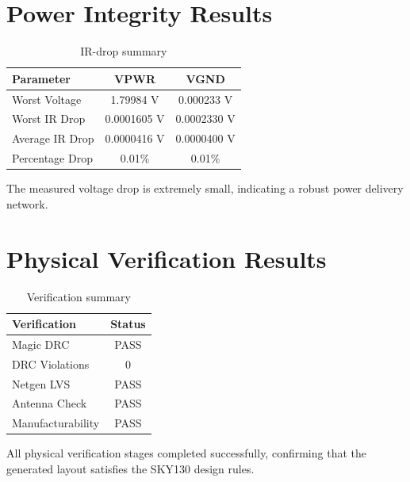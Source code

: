 
\section{Power Integrity Results}

\begin{table}[!htbp]
\centering
\caption{IR-drop summary}
\label{tab:irdrop_result}
\begin{tabular}{lcc}
\toprule
Parameter & VPWR & VGND\\
\midrule
Worst Voltage & 1.79984 V & 0.000233 V\\
Worst IR Drop & 0.0001605 V & 0.0002330 V\\
Average IR Drop & 0.0000416 V & 0.0000400 V\\
Percentage Drop & 0.01\% & 0.01\%\\
\bottomrule
\end{tabular}
\end{table}

The measured voltage drop is extremely small, indicating a robust power delivery network.


\section{Physical Verification Results}

\begin{table}[!htbp]
\centering
\caption{Verification summary}
\label{tab:verification}
\begin{tabular}{lc}
\toprule
Verification & Status\\
\midrule
Magic DRC & PASS\\
DRC Violations & 0\\
Netgen LVS & PASS\\
Antenna Check & PASS\\
Manufacturability & PASS\\
\bottomrule
\end{tabular}
\end{table}

All physical verification stages completed successfully, confirming that the generated layout satisfies the SKY130 design rules.




